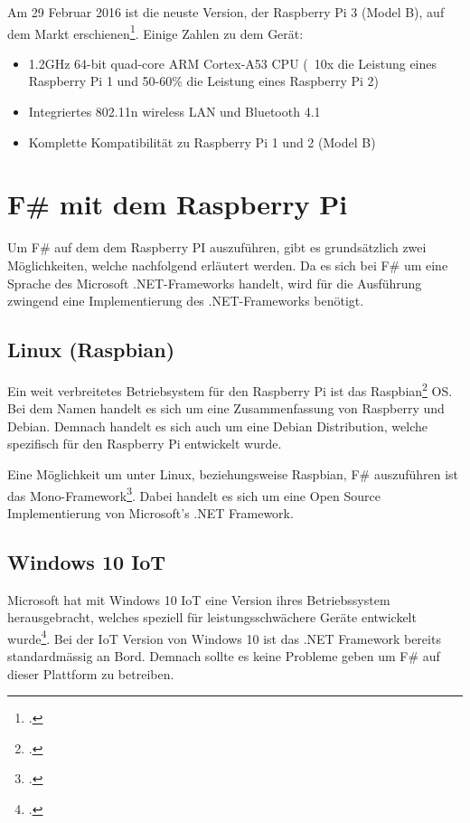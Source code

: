 
Am 29 Februar 2016 ist die neuste Version, der Raspberry Pi 3 (Model B), auf dem Markt erschienen\footcite{Raspberry_Pi_3_2016-04-24}. Einige Zahlen zu dem Gerät:

\begin{itemize}
\item 1.2GHz 64-bit quad-core ARM Cortex-A53 CPU (~10x die Leistung eines Raspberry Pi 1 und 50-60\% die Leistung eines Raspberry Pi 2)
\item Integriertes 802.11n wireless LAN und Bluetooth 4.1
\item Komplette Kompatibilität zu Raspberry Pi 1 und 2 (Model B)
\end{itemize} 


\section{F\# mit dem Raspberry Pi}
\label{sec:recherche:fsharprpi}
Um F\# auf dem dem Raspberry PI auszuführen, gibt es grundsätzlich zwei Möglichkeiten, welche nachfolgend erläutert werden.
Da es sich bei F\# um eine Sprache des Microsoft .NET-Frameworks handelt, wird für die Ausführung zwingend eine Implementierung des .NET-Frameworks benötigt.

\subsection{Linux (Raspbian)}
Ein weit verbreitetes Betriebsystem für den Raspberry Pi ist das Raspbian\footcite{FrontPage_-_Raspbian_2016-04-24} OS. Bei dem Namen handelt es sich um eine Zusammenfassung von Raspberry und Debian. Demnach handelt es sich auch um eine Debian Distribution, welche spezifisch für den Raspberry Pi entwickelt wurde.

Eine Möglichkeit um unter Linux, beziehungsweise Raspbian, F\# auszuführen ist das Mono-Framework\footcite{Mono_2016-04-24}. Dabei handelt es sich um eine Open Source Implementierung von Microsoft's .NET Framework.

\subsection{Windows 10 IoT}
Microsoft hat mit Windows 10 IoT eine Version ihres Betriebssystem herausgebracht, welches speziell für leistungsschwächere Geräte entwickelt wurde\footcite{Windows_IoT_2016-04-24}. Bei der IoT Version von Windows 10 ist das .NET Framework bereits standardmässig an Bord. Demnach sollte es keine Probleme geben um F\# auf dieser Plattform zu betreiben.



